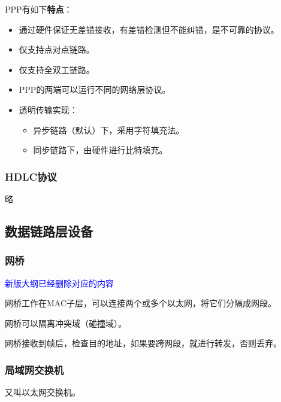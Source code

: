 \documentclass[12pt, a4paper, oneside]{ctexart}
\begin{document}
PPP有如下\textbf{特点}：
\begin{itemize}
    \item 通过硬件保证无差错接收，有差错检测但不能纠错，是不可靠的协议。
    \item 仅支持点对点链路。
    \item 仅支持全双工链路。
    \item PPP的两端可以运行不同的网络层协议。
    \item 透明传输实现：
    \begin{itemize}
        \item 异步链路（默认）下，采用字符填充法。
        \item 同步链路下，由硬件进行比特填充。
    \end{itemize}
\end{itemize}

\subsubsection{HDLC协议}

略

\subsection{数据链路层设备}

\subsubsection{网桥}

\textcolor{blue}{新版大纲已经删除对应的内容}

网桥工作在MAC子层，可以连接两个或多个以太网，将它们分隔成网段。

网桥可以隔离冲突域（碰撞域）。

网桥接收到帧后，检查目的地址，如果要跨网段，就进行转发，否则丢弃。

\subsubsection{局域网交换机}

又叫以太网交换机。
\end{document}
